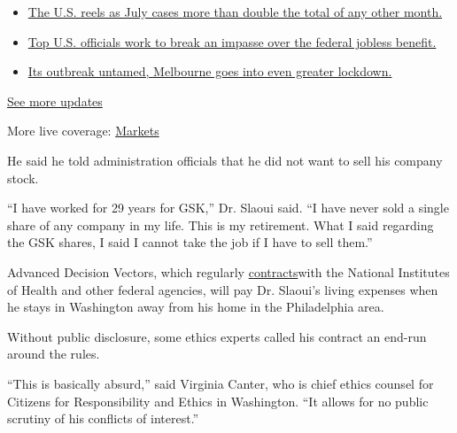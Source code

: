 \begin{itemize}
\tightlist
\item
  \href{https://www.nytimes.com/2020/08/01/world/coronavirus-covid-19.html?action=click\&pgtype=Article\&state=default\&region=MAIN_CONTENT_1\&context=storylines_live_updates\#link-34047410}{The
  U.S. reels as July cases more than double the total of any other
  month.}
\item
  \href{https://www.nytimes.com/2020/08/01/world/coronavirus-covid-19.html?action=click\&pgtype=Article\&state=default\&region=MAIN_CONTENT_1\&context=storylines_live_updates\#link-780ec966}{Top
  U.S. officials work to break an impasse over the federal jobless
  benefit.}
\item
  \href{https://www.nytimes.com/2020/08/01/world/coronavirus-covid-19.html?action=click\&pgtype=Article\&state=default\&region=MAIN_CONTENT_1\&context=storylines_live_updates\#link-2bc8948}{Its
  outbreak untamed, Melbourne goes into even greater lockdown.}
\end{itemize}

\href{https://www.nytimes.com/2020/08/01/world/coronavirus-covid-19.html?action=click\&pgtype=Article\&state=default\&region=MAIN_CONTENT_1\&context=storylines_live_updates}{See
more updates}

More live coverage:
\href{https://www.nytimes.com/live/2020/07/31/business/stock-market-today-coronavirus?action=click\&pgtype=Article\&state=default\&region=MAIN_CONTENT_1\&context=storylines_live_updates}{Markets}

He said he told administration officials that he did not want to sell
his company stock.

``I have worked for 29 years for GSK,'' Dr. Slaoui said. ``I have never
sold a single share of any company in my life. This is my retirement.
What I said regarding the GSK shares, I said I cannot take the job if I
have to sell them.''

Advanced Decision Vectors, which regularly
\href{https://advancedvllc.com/clients/}{contracts}with the National
Institutes of Health and other federal agencies, will pay Dr. Slaoui's
living expenses when he stays in Washington away from his home in the
Philadelphia area.

Without public disclosure, some ethics experts called his contract an
end-run around the rules.

``This is basically absurd,'' said Virginia Canter, who is chief ethics
counsel for Citizens for Responsibility and Ethics in Washington. ``It
allows for no public scrutiny of his conflicts of interest.''

